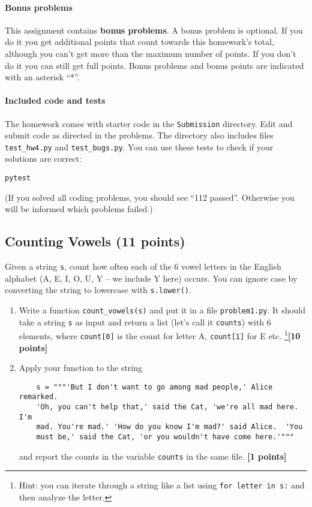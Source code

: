 \documentclass[letterpaper]{scrartcl}
\newcounter{TotalPoints}
\newcommand{\points}[1]{\textbf{[#1 points]}\stepcounter{TotalPoints}}
\newenvironment{enuma}{\begin{enumerate}[label=(\alph*)]}{\end{enumerate}}
\begin{document}
\paragraph{Bonus problems}

This assignment contains \textbf{bonus problems}. A bonus problem is
optional. If you do it you get additional points that count towards
this homework's total, although you can't get more than the maximum
number of points. If you don't do it you can still get full
points. Bonus problems and bonus points are indicated with an asterisk
``*''.

\paragraph{Included code and tests}

The homework comes with starter code in the \texttt{Submission}
directory. Edit and submit code as directed in the problems. The
directory also includes files \texttt{test\_hw4.py} and
\texttt{test\_bugs.py}. You can use these tests to check if your
solutions are correct:
\begin{verbatim}
pytest
\end{verbatim}
(If you solved all coding problems, you should see ``112
passed''. Otherwise you will be informed which problems failed.)

\subsection{Counting Vowels (11 points)}
\label{sec:vowels}

Given a string \texttt{s}, count how often each of the 6 vowel letters
in the English alphabet (A, E, I, O, U, Y -- we include Y here)
occurs. You can ignore case by converting the string to lowercase with
\texttt{s.lower()}.

\begin{enuma}
\item Write a function \texttt{count_vowels(s)} and put it in a
  file \texttt{problem1.py}. It should take a string \texttt{s} as
  input and return a list (let's call it \texttt{counts}) with 6
  elements, where \texttt{count[0]} is the count for letter A,
  \texttt{count[1]} for E etc. \footnote{Hint: you can iterate through
    a string like a list using \texttt{for letter in s:} and
    then analyze the letter.}\points{10}
\item Apply your function to the string
  \begin{verbatim}
    s = """'But I don't want to go among mad people,' Alice remarked.
    'Oh, you can't help that,' said the Cat, 'we're all mad here. I'm
    mad. You're mad.' 'How do you know I'm mad?' said Alice.  'You
    must be,' said the Cat, 'or you wouldn't have come here.'"""
  \end{verbatim}
  and report the counts in the variable \texttt{counts}
  in the same file. \points{1}
\end{enuma}
\end{document}
